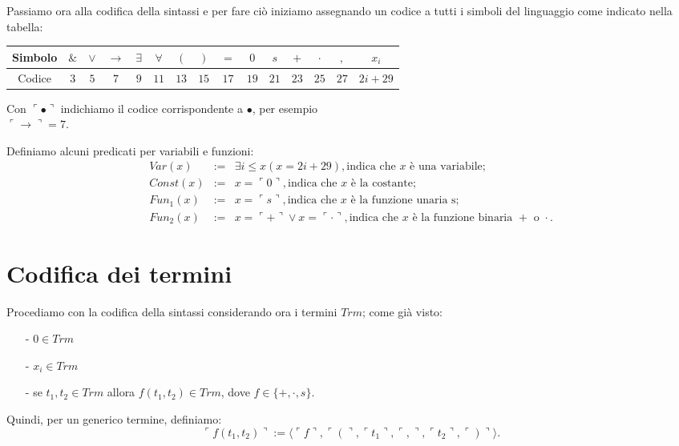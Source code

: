Passiamo ora alla codifica della sintassi e per fare ci\`o iniziamo assegnando un codice a tutti i simboli del linguaggio come indicato nella tabella:

\vspace{0.5cm}

\begin{tabular}{|c|c|c|c|c|c|c|c|c|c|c|c|c|c|c|}
\hline
Simbolo & $\&$ & $\vee$ & $\rightarrow$ & $\exists$ & $\forall$ & $($ & $)$ & $=$ & $0$ & $s$ & $+$ & $\cdot$ & $,$ & $x_i$ \\
\hline
Codice  & $3$ & $5$ & $7$ & $9$ & $11$ & $13$ & $15$ & $17$ & $19$ & $21$ & $23$ & $25$ & $27$ & $2 i+29$\\
\hline
\end{tabular}
\vspace{0.5cm}

Con $\ulcorner \bullet \urcorner$ indichiamo il codice corrispondente a $\bullet$, per esempio \\ $\ulcorner \rightarrow \urcorner = 7$.

Definiamo alcuni predicati per variabili e funzioni:
\begin{eqnarray*}
Var(x) &:=& \exists i \leq x(x=2i+29), \text{indica che $x$ \`e una variabile;} \\
Const(x) &:=& x=  \ulcorner 0  \urcorner, \text{indica che $x$ \`e la costante;}\\
Fun_1(x) &:=& x=  \ulcorner s \urcorner, \text{indica che $x$ \`e la funzione unaria s;}\\
Fun_2(x) &:=& x=  \ulcorner  + \urcorner \vee  x= \ulcorner \cdot \urcorner, \text{indica che $x$ \`e la funzione binaria $+$ o $\cdot$.}
\end{eqnarray*}

 \section{Codifica dei termini}
Procediamo con la codifica della sintassi considerando ora i termini $Trm$; come gi\`a visto:
\begin{itemize}

\item[-]{$0 \in Trm$}
\item[-]{$x_i \in Trm$}
\item[-]{se $t_1, t_2 \in Trm$ allora $f(t_1,t_2) \in Trm$, dove $f\in \{+, \cdot, s\}$}.
\end{itemize}



Quindi, per un generico termine, definiamo:
\begin{displaymath}
 \ulcorner f(t_1,t_2) \urcorner :=  \langle  \ulcorner f \urcorner,  \ulcorner ( \urcorner,  \ulcorner t_1 \urcorner,  \ulcorner , \urcorner,  \ulcorner t_2 \urcorner ,  \ulcorner ) \urcorner\rangle .
\end{displaymath}

